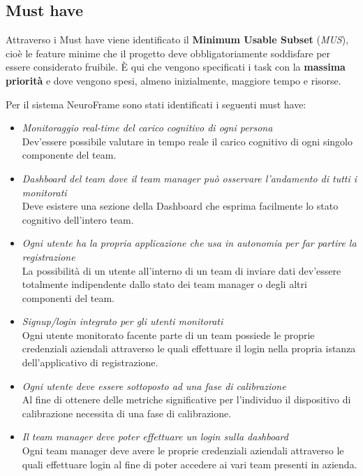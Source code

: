 \subsection{Must have}
Attraverso i Must have viene identificato il {\bf Minimum Usable Subset} (\emph{MUS}), cioè le feature minime che il progetto deve obbligatoriamente soddisfare per essere considerato fruibile.\newline
È qui che vengono specificati i task con la {\bf massima priorità} e dove vengono spesi, almeno inizialmente, maggiore tempo e risorse.\newline

\noindent Per il sistema NeuroFrame sono stati identificati i seguenti must have:
\begin{itemize}
    \item \emph{Monitoraggio real-time del carico cognitivo di ogni persona}\\
    {Dev'essere possibile valutare in tempo reale il carico cognitivo di ogni singolo componente del team.}
    \item \emph{Dashboard del team dove il team manager può osservare l'andamento di tutti i monitorati}\\
    {Deve esistere una sezione della Dashboard che esprima facilmente lo stato cognitivo dell'intero team. \vspace{5mm}}
    \item \emph{Ogni utente ha la propria applicazione che usa in autonomia per far partire la registrazione}\\
    {La possibilità di un utente all'interno di un team di inviare dati dev'essere totalmente indipendente dallo stato dei team manager o degli altri componenti del team.}
    \item \emph{Signup/login integrato per gli utenti monitorati}\\
    {Ogni utente monitorato facente parte di un team possiede le proprie credenziali aziendali attraverso le quali effettuare il login nella propria istanza dell'applicativo di registrazione.}
    \item \emph{Ogni utente deve essere sottoposto ad una fase di calibrazione}\\
    {Al fine di ottenere delle metriche significative per l'individuo il dispositivo di calibrazione necessita di una fase di calibrazione.}
    \item \emph{Il team manager deve poter effettuare un login sulla dashboard}\\
    {Ogni team manager deve avere le proprie credenziali aziendali attraverso le quali effettuare login al fine di poter accedere ai vari team presenti in azienda.}
\end{itemize}
